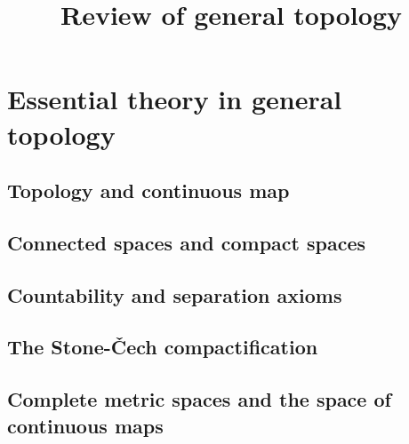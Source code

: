 





\title{Review of general topology}


\author{}

\maketitle

\setcounter{tocdepth}{1}
\tableofcontents

\part{Essential theory in general topology}
\chapter{Topology and continuous map}
    
    
    
\chapter{Connected spaces and compact spaces}
    
    
    
    
    
    
\chapter{Countability and separation axioms}
    
    
    
     
\chapter{The Stone-\v{C}ech compactification}
    
    
\chapter{Complete metric spaces and the space of continuous maps}
    
    
    
    

